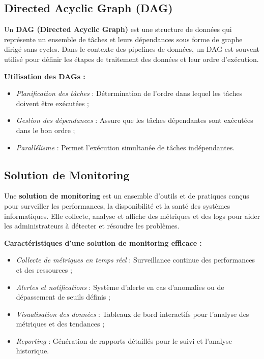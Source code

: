     \subsection{Directed Acyclic Graph (DAG)}
    
    Un \textbf{DAG (Directed Acyclic Graph)} est une structure de données qui représente un ensemble de tâches et leurs dépendances sous forme
     de graphe dirigé sans cycles\cite{dagdef}. Dans le contexte des pipelines de données, un DAG est souvent utilisé pour définir les étapes de traitement des données et leur ordre d'exécution.
    
    \textbf{Utilisation des DAGs :}
    \begin{itemize}
        \item \textit{Planification des tâches} : Détermination de l'ordre dans lequel les tâches doivent être exécutées ; 
        \item \textit{Gestion des dépendances} : Assure que les tâches dépendantes sont exécutées dans le bon ordre ;
        \item \textit{Parallélisme} : Permet l'exécution simultanée de tâches indépendantes.
    \end{itemize}
    
    \subsection{Solution de Monitoring}
    
    Une \textbf{solution de monitoring} est un ensemble d'outils et de pratiques conçus pour surveiller les performances,
     la disponibilité et la santé des systèmes informatiques. Elle collecte, analyse et affiche des métriques et des logs 
     pour aider les administrateurs à détecter et résoudre les problèmes\cite{monitoring}.
    
    \textbf{Caractéristiques d'une solution de monitoring efficace :}
    \begin{itemize}
        \item \textit{Collecte de métriques en temps réel} : Surveillance continue des performances et des ressources ;
        \item \textit{Alertes et notifications} : Système d'alerte en cas d'anomalies ou de dépassement de seuils définis ;
        \item \textit{Visualisation des données} : Tableaux de bord interactifs pour l'analyse des métriques et des tendances ;
        \item \textit{Reporting} : Génération de rapports détaillés pour le suivi et l'analyse historique.
    \end{itemize}
    

